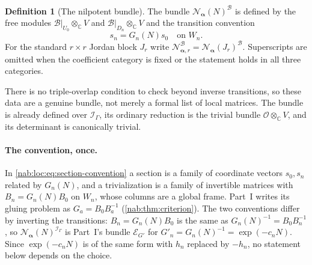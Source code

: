\documentclass[11pt,letterpaper]{article}
\theoremstyle{definition}
\newtheorem{definition}[definition]{Definition}
\theoremstyle{remark}
\newcommand{\C}{\mathbb C}
\newcommand{\OO}{\mathcal O}
\newcommand{\II}{\mathscr I_\Gamma}
\newcommand{\BB}{\mathscr B}
\newcommand{\profile}{\boldsymbol\alpha}
\newcommand{\NN}[1]{\mathcal N_{\profile,#1}}
\numberwithin{equation}{section}
\begin{document}
\begin{definition}[The nilpotent bundle]\label{nab:loc:def:bundle}
The bundle $\mathcal N_{\profile}(N)^{\BB}$ is defined by the free modules
$\BB|_{U_0}\otimes_\C V$ and $\BB|_{D_n}\otimes_\C V$ and the transition
convention
\begin{equation}\label{nab:loc:eq:section-convention}
 s_n=G_n(N)s_0\quad\text{on }W_n.
\end{equation}
For the standard $r\times r$ Jordan block $J_r$ write
$\NN r^{\BB}=\mathcal N_{\profile}(J_r)^{\BB}$. Superscripts are omitted when
the coefficient category is fixed or the statement holds in all three
categories.
\end{definition}

There is no triple-overlap condition to check beyond inverse transitions, so
these data are a genuine bundle, not merely a formal list of local matrices.
The bundle is already defined over $\II$, its ordinary reduction is the
trivial bundle $\OO\otimes_\C V$, and its determinant is canonically trivial.

\paragraph{The convention, once.} In \eqref{nab:loc:eq:section-convention} a
section is a family of coordinate vectors $s_0,s_n$ related by $G_n(N)$, and a
trivialization is a family of invertible matrices with $B_n=G_n(N)B_0$ on
$W_n$, whose columns are a global frame. Part~I writes its gluing problem as
$G_a=B_0B_a^{-1}$ (\cref{nab:thm:criterion}). The two conventions differ by
inverting the transitions: $B_n=G_n(N)B_0$ is the same as
$G_n(N)^{-1}=B_0B_n^{-1}$, so $\mathcal N_{\profile}(N)^{\II}$ is Part~I's
bundle $\mathcal E_{G'}$ for $G'_n=G_n(N)^{-1}=\exp(-c_nN)$. Since
$\exp(-c_nN)$ is of the same form with $h_n$ replaced by $-h_n$, no statement
below depends on the choice.
\end{document}
